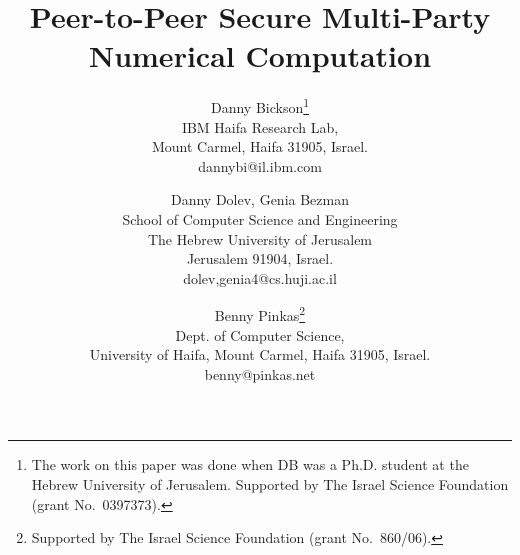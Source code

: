 \documentclass[times, 10pt,twocolumn]{article}
\begin{document}
\newcommand{\ignore}[1]{}
\newcommand{\db}[1]{{\sffamily\bfseries\Large \mbox{***DB:\ } #1 \mbox{****
}}}
\newcommand{\sk}[1]{{\sffamily\bfseries\Large \mbox{***SK:\ } #1 \mbox{****
}}}
\newcommand{\comment}[1]  {}
\newcommand\ie{{\textsl{i.e.\,}}}
\newcommand\eg{{\textsl{e.g.\,}}}
\newcommand\etal{{\textsl{et al.\,}}}
\def\BE{\begin{equation}}
\def\EE{\end{equation}}
\def\BEA{\begin{eqnarray}}
\def\EEA{\end{eqnarray}}
\newcommand{\cut}[1]{{}}
\newcommand\va{{\bf a}} \newcommand\vb{{\bf b}}
\newcommand\vc{{\bf c}}
\newcommand\vd{{\bf d}}
\newcommand\ve{{\bf e}}
\newcommand\vf{{\bf f}}
\newcommand\vg{{\bf g}}
\newcommand\vh{{\bf h}}
\newcommand\vi{{\bf i}}
\newcommand\vj{{\bf j}}
\newcommand\vk{{\bf k}}
\newcommand\vl{{\bf l}}
\newcommand\vm{{\bf m}}
\newcommand\vn{{\bf n}}
\newcommand\vo{{\bf o}}
\newcommand\vp{{\bf p}}
\newcommand\vq{{\bf q}}
\newcommand\vr{{\bf r}}
\newcommand\vs{{\bf s}}
\newcommand\vt{{\bf t}}
\newcommand\vu{{\bf u}}
\newcommand\vv{{\bf v}}
\newcommand\vw{{\bf w}}
\newcommand\vx{{\bf x}}
\newcommand\vy{{\bf y}}
\newcommand\vz{{\bf z}}
\newcommand\mA{{\bf A}} \newcommand\mB{{\bf B}}
\newcommand\mC{{\bf C}}
\newcommand\mD{{\bf D}}
\newcommand\mE{{\bf E}}
\newcommand\mF{{\bf F}}
\newcommand\mG{{\bf G}}
\newcommand\mH{{\bf H}}
\newcommand\mI{{\bf I}}
\newcommand\mJ{{\bf J}}
\newcommand\mK{{\bf K}}
\newcommand\mL{{\bf L}}
\newcommand\mM{{\bf M}}
\newcommand\mN{{\bf N}}
\newcommand\mO{{\bf O}}
\newcommand\mP{{\bf P}}
\newcommand\mQ{{\bf Q}}
\newcommand\mR{{\bf R}}
\newcommand\mS{{\bf S}}
\newcommand\mT{{\bf T}}
\newcommand\mU{{\bf U}}
\newcommand\mV{{\bf V}}
\newcommand\mW{{\bf W}}
\newcommand\mX{{\bf X}}
\newcommand\mY{{\bf Y}}
\newcommand\mZ{{\bf Z}}



\title{Peer-to-Peer Secure Multi-Party Numerical Computation}
\author{Danny Bickson\thanks{The work on this paper was done when DB was a Ph.D. student at the Hebrew University of Jerusalem. Supported by The Israel Science Foundation
  (grant No.~0397373).}\\
IBM Haifa Research Lab,\\Mount Carmel, Haifa 31905, Israel.\\ dannybi@il.ibm.com\\
\and Danny Dolev, Genia Bezman\\
School of Computer Science and Engineering\\
The Hebrew University of Jerusalem\\
Jerusalem 91904, Israel.\\
dolev,genia4@cs.huji.ac.il\\
\and Benny Pinkas\thanks{Supported by The Israel Science Foundation
  (grant No.~860/06).}\\
Dept. of Computer Science,\\ University of Haifa, Mount Carmel, Haifa 31905, Israel.\\
benny@pinkas.net\\
}
\end{document}
